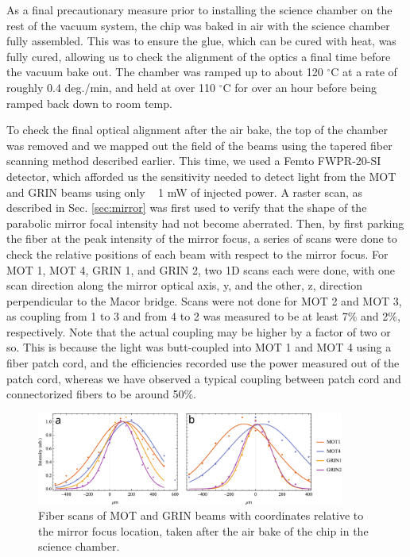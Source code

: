 As a final precautionary measure prior to installing the science chamber on the rest of the vacuum system, the chip was baked in air with the science chamber fully assembled. This was to ensure the glue, which can be cured with heat, was fully cured, allowing us to check the alignment of the optics a final time before the vacuum bake out. The chamber was ramped up to about 120 $^{\circ}$C at a rate of roughly 0.4 deg./min, and held at over 110 $^{\circ}$C for over an hour before being ramped back down to room temp. 

To check the final optical alignment after the air bake, the top of the chamber was removed and we mapped out the field of the beams using the tapered fiber scanning method described earlier. This time, we used a Femto FWPR-20-SI detector, which afforded us the sensitivity needed to detect light from the MOT and GRIN beams using only ~ 1 mW of injected power. A raster scan, as described in Sec. \ref{sec:mirror} was first used to verify that the shape of the parabolic mirror focal intensity had not become aberrated. Then, by first parking the fiber at the peak intensity of the mirror focus, a series of scans were done to check the relative positions of each beam with respect to the mirror focus. For MOT 1, MOT 4, GRIN 1, and GRIN 2, two 1D scans each were done, with one scan direction along the mirror optical axis, y, and the other, z, direction perpendicular to the Macor bridge. Scans were not done for MOT 2 and MOT 3, as coupling from 1 to 3 and from 4 to 2 was measured to be at least 7$\%$ and 2$\%$, respectively. Note that the actual coupling may be higher by a factor of two or so. This is because the light was butt-coupled into MOT 1 and MOT 4 using a fiber patch cord, and the efficiencies recorded use the power measured out of the patch cord, whereas we have observed a typical coupling between patch cord and connectorized fibers to be around 50$\%$.
\begin{figure}[htb]
    \centering
    \includegraphics[width=0.9\textwidth]{Images/M1_M4_G1_G2_fiberscanZandY.pdf}
    \caption{Fiber scans of MOT and GRIN beams with coordinates relative to the mirror focus location, taken after the air bake of the chip in the science chamber.}
    \label{fig:fiber_scan_post_airbake}
\end{figure}

